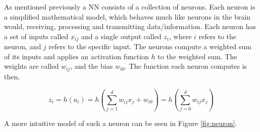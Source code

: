 As mentioned previously a \gls{NN} consists of a collection of neurons. Each
neuron is a simplified mathematical model, which behaves much like neurons
in the brain would, receiving, processing and transmitting data/information.
Each neuron has a set of inputs called $x_{ij}$ and a single output called
$z_i$, where $i$ refers to the neuron, and $j$ refers to the specific input. The
neurons compute a weighted sum of its inputs and applies an activation function
$h$ to the weighted sum. The weights are called $w_{ij}$, and the bias $w_{i0}$.
The function each neuron computes is then,

\begin{equation}\label{eq:neuron}
    z_i = h(a_i) = h\left(
        \sum_{j = 1}^d w_{ij}x_j + w_{i0}
 \right) = h\left(
        \sum_{j = 0}^d w_{ij}x_j \right)
\end{equation}

A more intuitive model of such a neuron can be seen in Figure \ref{fig:neuron}.

